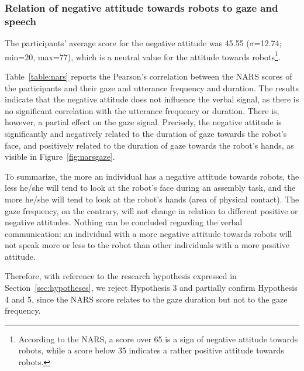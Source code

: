 \subsubsection{Relation of negative attitude towards robots to gaze and speech}\label{sec:nars}

The participants' average score for the negative attitude was 45.55 ($\sigma$=12.74; min=20, max=77), which is a neutral value for the attitude towards robots\footnote{According to the NARS, a score over 65 is a sign of negative attitude towards robots, while a score below 35 indicates a rather positive attitude towards robots.}. 

Table~\ref{table:nars} reports the Pearson's correlation between the NARS scores of the participants and their gaze and utterance frequency and duration. The results indicate that the negative attitude does not influence the verbal signal, as there is no significant correlation with the utterance frequency or duration. 
There is, however, a partial effect on the gaze signal. Precisely, the negative attitude is significantly and negatively related to the duration of gaze towards the robot's face, and positively related to the duration of gaze towards the robot's hands, as visible in Figure~\ref{fig:narsgaze}. 

To summarize, the more an individual has a negative attitude towards robots, the less he/she will tend to look at the robot's face during an assembly task, and the more he/she will tend to look at the robot's hands (area of physical contact). The gaze frequency, on the contrary, will not change in relation to different positive or negative attitudes. 
Nothing can be concluded regarding the verbal communication: an individual with a more negative attitude towards robots will not speak more or less to the robot than other individuals with a more positive attitude. 

Therefore, with reference to the research hypothesis expressed in Section~\ref{sec:hypotheses}, we reject Hypothesis 3
and partially confirm Hypothesis 4 and 5, since the NARS score relates to the gaze duration but not to the gaze frequency.


